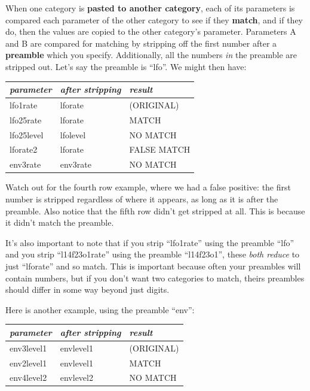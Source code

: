 \documentclass{article}
\begin{document}
When one category is {\bf pasted to another category}, each of its parameters is compared each parameter of the other category to see if they {\bf match}, and if they do, then the values are copied to the other category's parameter.   Parameters A and B are compared for matching by stripping off the first number after a {\bf preamble} which you specify.   Additionally, all the numbers {\it in} the preamble are stripped out. Let's say the preamble is ``lfo''.  We might then have:

\begin{center}
\begin{tabular}{l@{\ \ \(\longrightarrow\)\ \ }ll}
	{\it parameter} & {\it after stripping} & {\it result}\\
	\hline
	lfo1rate 	&	lforate	& (ORIGINAL)\\
	lfo25rate	&	lforate	& MATCH\\
	lfo25level	&	lfolevel	& NO MATCH\\
	lforate2	&	lforate	& FALSE MATCH\\
	env3rate	&	env3rate   & NO MATCH\\
\end{tabular}
\end{center}

Watch out for the fourth row example, where we had a false positive: the first number is stripped regardless of where it appears, as long as it is after the preamble.  Also notice that the fifth row didn't get stripped at all.  This is because it didn't match the preamble.

It's also important to note that if you strip ``lfo1rate'' using the preamble ``lfo'' and you strip ``l14f23o1rate'' using the preamble ``l14f23o1'', these {\it both reduce} to just ``lforate'' and so match.  This is important because often your preambles will contain numbers, but if you don't want  two categories to match, theirs preambles should differ in some way beyond just digits.

Here is another example, using the preamble ``env'':

\begin{center}
\begin{tabular}{l@{\ \ \(\longrightarrow\)\ \ }ll}
	{\it parameter} & {\it after stripping} & {\it result}\\
	\hline
	env3level1	&	envlevel1 & (ORIGINAL)\\
	env2level1	&	envlevel1	& MATCH\\
	env4level2	&	envlevel2	& NO MATCH\\
\end{tabular}
\end{center}
\end{document}
